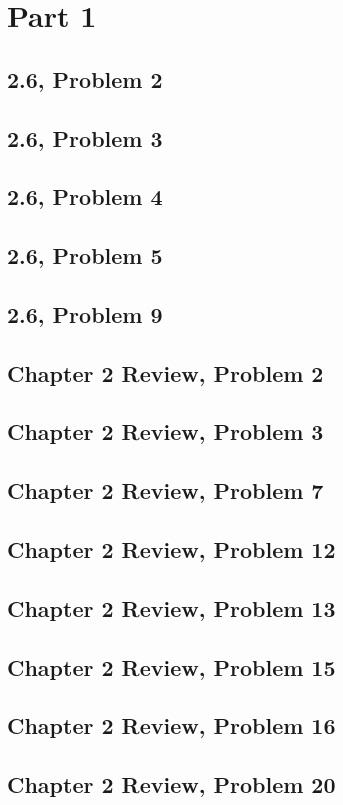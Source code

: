 \documentclass[10pt]{mypackage}
\begin{document}
\RaggedRight
\section{Part 1}%
\subsection{2.6, Problem 2}%
\subsection{2.6, Problem 3}%
\subsection{2.6, Problem 4}%
\subsection{2.6, Problem 5}%
\subsection{2.6, Problem 9}%
\subsection{Chapter 2 Review, Problem 2}%
\subsection{Chapter 2 Review, Problem 3}%
\subsection{Chapter 2 Review, Problem 7}%
\subsection{Chapter 2 Review, Problem 12}%
\subsection{Chapter 2 Review, Problem 13}%
\subsection{Chapter 2 Review, Problem 15}%
\subsection{Chapter 2 Review, Problem 16}%
\subsection{Chapter 2 Review, Problem 20}%
\end{document}
